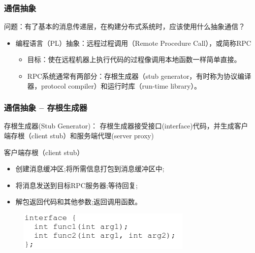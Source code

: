 \begin{frame}[fragile]
    \frametitle{通信抽象}
    问题：有了基本的消息传递层，在构建分布式系统时，应该使用什么抽象通信？
    \begin{itemize}
        \item 编程语言（PL）抽象：远程过程调用（Remote Procedure Call），或简称RPC
        \begin{itemize}
            \item 目标：使在远程机器上执行代码的过程像调用本地函数一样简单直接。
            \item RPC系统通常有两部分：存根生成器（stub generator，有时称为协议编译器，protocol compiler）和运行时库（run-time library）。
        \end{itemize}
    \end{itemize}
    
\end{frame}

\begin{frame}[fragile]
    \frametitle{通信抽象 -- 存根生成器}
    存根生成器(Stub Generator)：    存根生成器接受接口(interface)代码，并生成客户端存根（client stub）和服务端代理(server proxy)
    
    客户端存根（client stub）
    \begin{itemize}
        \item 创建消息缓冲区;将所需信息打包到消息缓冲区中;
        \item 将消息发送到目标RPC服务器;等待回复;
        \item 解包返回代码和其他参数;返回调用函数。

    \end{itemize}
    
        \begin{figure}
            \includegraphics[width=0.6\linewidth]{figs/rpc-interface.png}
        \end{figure}
\end{frame}

